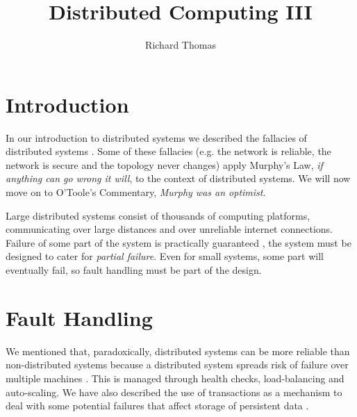 \title{Distributed Computing III}
\author{Richard Thomas}
\date{}

\maketitle

\section{Introduction}

In our introduction to distributed systems we described the fallacies of distributed systems \cite{distributed1-notes}.
Some of these fallacies (e.g. the network is reliable, the network is secure and the topology never changes)
apply Murphy's Law, \textit{if anything can go wrong it will}, to the context of distributed systems.
We will now move on to O'Toole's Commentary, \textit{Murphy was an optimist}.

Large distributed systems consist of thousands of computing platforms,
communicating over large distances and over unreliable internet connections.
Failure of some part of the system is practically guaranteed \cite{datacenter-computer},
the system must be designed to cater for \emph{partial failure}.
Even for small systems, some part will eventually fail,
so fault handling must be part of the design.


\section{Fault Handling}\label{sec:faults}

We mentioned that, paradoxically, distributed systems can be more reliable than non-distributed systems
because a distributed system spreads risk of failure over multiple machines \cite{distributed1-notes}.
This is managed through health checks, load-balancing and auto-scaling.
We have also described the use of transactions as a mechanism to deal with some potential failures
that affect storage of persistent data \cite{distributed2-notes}.


